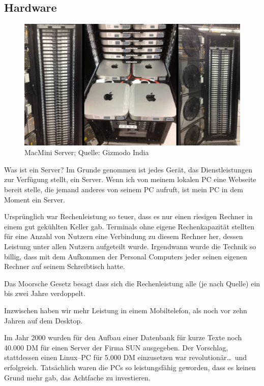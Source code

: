   \subsection{Hardware}
    \begin{frame}
      \begin{figure}
      \begin{center}  
        \includegraphics[width=1\textwidth]{pics/MacMiniServer}
      \end{center}
      \caption{MacMini Server; Quelle: Gizmodo India}
    \end{figure}
    \end{frame}
      Was ist ein Server? Im Grunde genommen ist jedes Gerät, das Dienstleistungen zur Verfügung stellt, ein Server. Wenn ich von meinem lokalen PC eine Webseite bereit stelle, die jemand anderes von seinem PC aufruft, ist mein PC in dem Moment ein Server.

      Ursprünglich war Rechenleistung so teuer, dass es nur einen riesigen Rechner in einem gut gekühlten Keller gab. Terminals ohne eigene Rechenkapazität stellten für eine Anzahl von Nutzern eine Verbindung zu diesem Rechner her, dessen Leistung unter allen Nutzern aufgeteilt wurde. Irgendwann wurde die Technik so billig, dass mit dem Aufkommen der Personal Computers jeder seinen eigenen Rechner auf seinem Schreibtisch hatte. 

      Das Moorsche Gesetz besagt dass sich die Rechenleistung alle (je nach Quelle) ein bis zwei Jahre verdoppelt.

      Inzwischen haben wir mehr Leistung in einem Mobiltelefon, als noch vor zehn Jahren auf dem Desktop.

      Im Jahr 2000 wurden für den Aufbau einer Datenbank für kurze Texte noch 40.000 DM für einen Server der Firma SUN ausgegeben. Der Vorschlag, stattdessen einen Linux--PC für 5.000 DM einzusetzen war revolutionär\ldots\ und erfolgreich. Tatsächlich waren die PCs so leistungsfähig geworden, dass es keinen Grund mehr gab, das Achtfache zu investieren.

